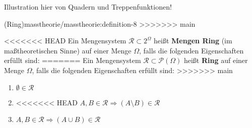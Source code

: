 \par
Illustration hier von Quadern und Treppenfunktionen!
\begin{definition}{(Ring)}{masstheorie/masstheorie:definition-8}
>>>>>>> main



\par
<<<<<<< HEAD
Ein Mengensystem \(\mathcal{R} \subset 2^{\Omega}\) heißt \textbf{Mengen Ring} (im maßtheoretischen Sinne) auf einer Menge \(\Omega\), falls die folgenden Eigenschaften erfüllt sind:
=======
Ein Mengensystem \(\mathcal{R} \subset \mathcal{P}(\Omega)\) heißt \textbf{Ring} auf einer Menge \(\Omega\), falls die folgenden Eigenschaften erfüllt sind:
>>>>>>> main
\begin{enumerate}

\item {} 
\par
\(\emptyset \in \mathcal{R}\)

\item {} 
\par
<<<<<<< HEAD
\(A,B \in \mathcal{R} \Rightarrow (A \setminus B) \in \mathcal{R}\)

\item {} 
\par
\(A,B \in \mathcal{R} \Rightarrow (A \cup B) \in \mathcal{R}\)

\end{enumerate}
\end{definition}
